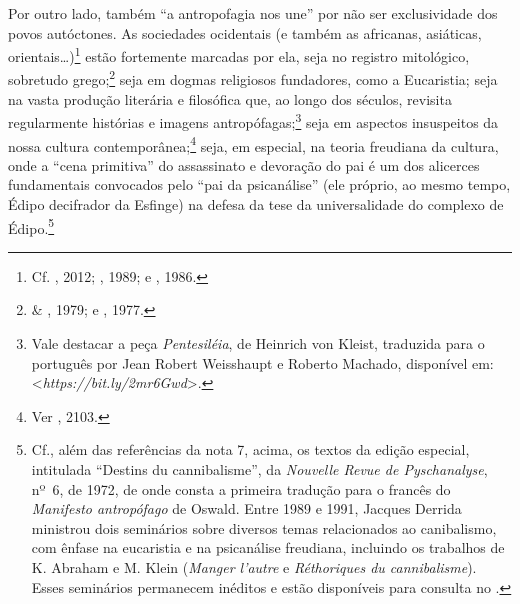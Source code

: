 Por outro lado, também ``a antropofagia nos une'' por não ser
exclusividade dos povos autóctones. As sociedades ocidentais (e também
as africanas, asiáticas, orientais\ldots{})\footnote{Cf. ,
  2012; , 1989; e , 1986.} estão fortemente marcadas por
ela, seja no registro mitológico, sobretudo grego;\footnote{ \&
  , 1979; e , 1977.} seja em dogmas religiosos
fundadores, como a Eucaristia; seja na vasta produção literária e
filosófica que, ao longo dos séculos, revisita regularmente histórias e
imagens antropófagas;\footnote{Vale destacar a peça \emph{Pentesiléia},
  de Heinrich von Kleist, traduzida para o português por Jean Robert
  Weisshaupt e Roberto Machado, disponível em:
  \textless{}\emph{https://bit.ly/2mr6Gwd}\textgreater{}.}
seja em aspectos insuspeitos da nossa cultura contemporânea;\footnote{Ver
  , 2103.} seja, em especial, na teoria freudiana da
cultura, onde a ``cena primitiva'' do assassinato e devoração do pai é
um dos alicerces fundamentais convocados pelo ``pai da psicanálise''
(ele próprio, ao mesmo tempo, Édipo decifrador da Esfinge) na defesa da
tese da universalidade do complexo de Édipo.\footnote{Cf., além das
  referências da nota 7, acima, os textos da edição especial, intitulada
  ``Destins du cannibalisme'', da \emph{Nouvelle Revue de Pyschanalyse},
  nº~6, de 1972, de onde consta a primeira tradução para o francês do
  \emph{Manifesto antropófago} de Oswald. Entre 1989 e 1991, Jacques
  Derrida ministrou dois seminários sobre diversos temas relacionados ao
  canibalismo, com ênfase na eucaristia e na psicanálise freudiana,
  incluindo os trabalhos de K. Abraham e M. Klein (\emph{Manger l'autre}
  e \emph{Réthoriques du cannibalisme}). Esses seminários permanecem
  inéditos e estão disponíveis para consulta no .}

